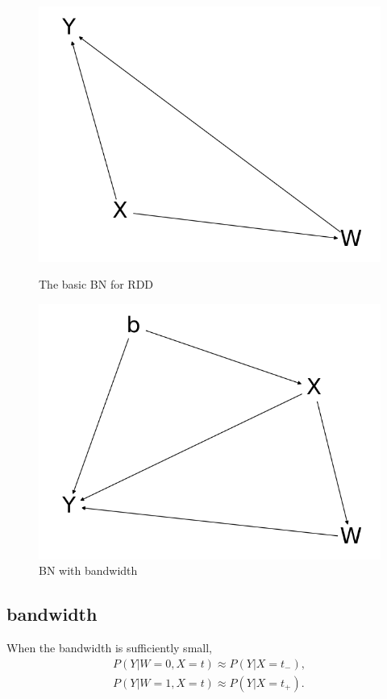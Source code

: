 \documentclass[a4 paper,12pt]{article}
\begin{document}
\begin{figure}[h]
	\centering
   \includegraphics[scale=0.5]{Figure_1.png}
   \caption{The basic BN for RDD}
   \label{fig:basic_rd_bns}
   \includegraphics[scale=0.5]{Figure_2.png}
   \caption{BN with bandwidth}
   \label{fig:bn_with_bdw}
\end{figure}

\subsection*{bandwidth}
When the bandwidth is sufficiently small,
\begin{align}
   P(Y|W=0,X=t)\approx P(Y|X=t_-),\\
   P(Y|W=1,X=t)\approx P(Y|X=t_+).
\end{align}
\end{document}

